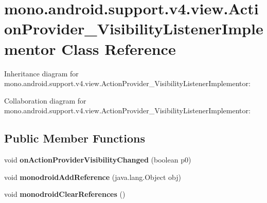 \hypertarget{classmono_1_1android_1_1support_1_1v4_1_1view_1_1_action_provider___visibility_listener_implementor}{}\section{mono.\+android.\+support.\+v4.\+view.\+Action\+Provider\+\_\+\+Visibility\+Listener\+Implementor Class Reference}
\label{classmono_1_1android_1_1support_1_1v4_1_1view_1_1_action_provider___visibility_listener_implementor}


Inheritance diagram for mono.\+android.\+support.\+v4.\+view.\+Action\+Provider\+\_\+\+Visibility\+Listener\+Implementor\+:


Collaboration diagram for mono.\+android.\+support.\+v4.\+view.\+Action\+Provider\+\_\+\+Visibility\+Listener\+Implementor\+:
\subsection*{Public Member Functions}
\begin{DoxyCompactItemize}
\item 
\mbox{\label{classmono_1_1android_1_1support_1_1v4_1_1view_1_1_action_provider___visibility_listener_implementor_a242f9c61e064dd7019178ff6eb12b360}} 
void {\bfseries on\+Action\+Provider\+Visibility\+Changed} (boolean p0)
\item 
\mbox{\label{classmono_1_1android_1_1support_1_1v4_1_1view_1_1_action_provider___visibility_listener_implementor_aa32d9154545fa29cbb80371b3c21e709}} 
void {\bfseries monodroid\+Add\+Reference} (java.\+lang.\+Object obj)
\item 
\mbox{\label{classmono_1_1android_1_1support_1_1v4_1_1view_1_1_action_provider___visibility_listener_implementor_ab013ec17b3d4bb666c53f6acfc93b9c4}} 
void {\bfseries monodroid\+Clear\+References} ()
\end{DoxyCompactItemize}
